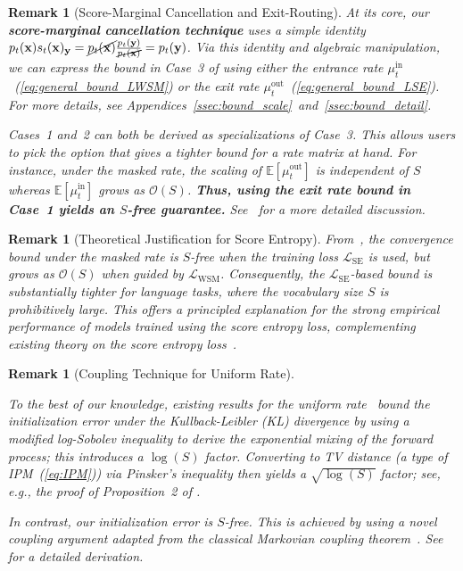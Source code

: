 \documentclass{article} %
\newtheorem{remark}[theorem]{Remark}
\def\eqref#1{equation~\ref{#1}}
\newcommand{\bfx}{{\bf x}}
\newcommand{\bfy}{ {\bf y}}
\newcommand{\LWSM}{\mathcal{L}_{\mathrm{WSM}}}
\newcommand{\LSE}{\mathcal{L}_{\mathrm{SE}}}
\renewcommand{\eqref}[1]{\textup{(\ref{#1})}}
\begin{document}
\begin{remark}[Score-Marginal Cancellation and Exit-Routing]\label{rmk:SMC_ER}
At its core, our \textbf{score-marginal cancellation technique} uses a simple identity $p_t(\bfx) s_t(\bfx)_\bfy=\cancel{p_t(\bfx)} \frac{p_t(\bfy)}{\cancel{p_t(\bfx)}}=p_t(\bfy)$. Via this identity and algebraic manipulation, we can express the 
bound in Case~3 of  using either the entrance rate $\mu^\mathrm{in}_t$~\eqref{eq:general_bound_LWSM} 
or the exit rate $\mu^\mathrm{out}_t$~\eqref{eq:general_bound_LSE}. For more details, see Appendices~\ref{ssec:bound_scale}~and~\ref{ssec:bound_detail}.

Cases~1 and~2 can both be derived as specializations of Case~3. This allows users to pick the option that gives a tighter bound for a rate matrix at hand. For instance, under the masked rate, the scaling of $\mathbb{E}[\mu^\mathrm{out}_t]$ is independent of
$S$ whereas $\mathbb{E}[\mu^\mathrm{in}_t]$ grows as $\mathcal{O}(S)$. \textbf{Thus, using the exit rate bound in Case~1 yields an $S$-free guarantee.} See~ for a more detailed discussion. 
\end{remark}

\begin{remark}[Theoretical Justification for Score Entropy]
    From~, the convergence bound under the masked rate is $S$-free when the training loss $\LSE$ is used, but grows as $\mathcal{O}(S)$ when guided by $\LWSM$. Consequently, the $\LSE$-based bound is substantially tighter for language tasks, where the vocabulary size $S$ is prohibitively large. This offers a principled explanation for the strong empirical performance of models trained using the score entropy loss, complementing existing theory on the score entropy loss~\cite{lou2024discrete,shi2024simplified,ou2025your}.
\end{remark}

\begin{remark}[Coupling Technique for Uniform Rate]\label{rmk:coupling}    

    To the best of our knowledge, existing results for the uniform rate~\citep{zhang2025convergence,ren2025discrete,liang2026discrete,dmitriev2026efficient} bound the initialization error under the Kullback-Leibler (KL) divergence by using a modified log-Sobolev inequality to derive the exponential mixing of the forward process; this introduces a ${\log(S)}$ factor. Converting to TV distance (a type of IPM~\eqref{eq:IPM}) via Pinsker's inequality then yields a $\sqrt{\log(S)}$ factor; see, e.g., the proof of Proposition~2 of \cite{zhang2025convergence}.

    In contrast, our initialization error is $S$-free. This is achieved by using a novel coupling argument adapted from the classical Markovian coupling theorem~\citep[Theorem~5.2]{levin2017markov}.  See~ for a detailed derivation.
\end{remark}
\end{document}
